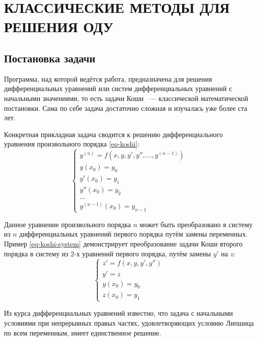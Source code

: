 \section{КЛАССИЧЕСКИЕ МЕТОДЫ ДЛЯ РЕШЕНИЯ ОДУ}

\subsection{Постановка задачи}

Программа, над которой ведётся работа, предназначена для решения дифференциальных уравнений или систем дифференциальных 
уравнений с начальными значениями, то есть задачи Коши ~--- классической математической постановки. 
Сама по себе задача достаточно сложная и изучалась уже более ста лет.

Конкретная прикладная задача сводится к решению дифференциального уравнения произвольного порядка \ref{eq-koshi}:
\begin{equation}
    \begin{cases}
        y^{(n)} = f(x, y, y', y'', ..., y^{(n - 1)})\\
        y(x_0) = y_0\\
        y'(x_0) = y_1\\
        y''(x_0) = y_2\\
        ...\\
        y^{(n - 1)}(x_0) = y_{n - 1}
    \end{cases}
    \label{eq-koshi}
\end{equation}

Данное уравнение произвольного порядка $n$ может быть преобразовано в систему из $n$ дифференциальных уравнений первого порядка путём
замены переменных. Пример \ref{eq-koshi-system} демонстрирует преобразование задачи Коши второго порядка в систему из 2-х уравнений
первого порядка, путём замены $y'$ на $z$:
\begin{equation}
    \begin{cases}
        z' = f(x, y, y', y'')\\
        y' = z\\
        y(x_0) = y_0\\
        z(x_0) = y_1
    \end{cases}
    \label{eq-koshi-system}
\end{equation}

Из курса дифференциальных уравнений известно, что задача с начальными условиями при непрерывных правых частях, удовлетворяющих условию
Липшица по всем переменным, имеет единственное решение.

